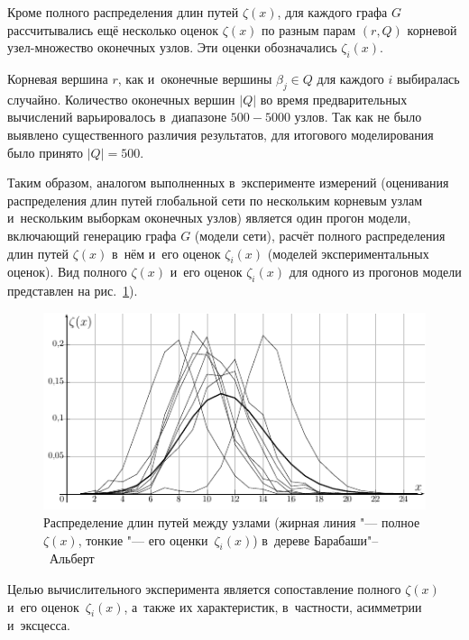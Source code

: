 \documentclass[10pt, a5paper]{article}
\begin{document}
Кроме полного распределения длин путей $\zeta(x)$, для каждого графа $G$ рассчитывались ещё 
несколько оценок $\zeta(x)$ по разным парам  $(r,Q)$ корневой узел-множество оконечных узлов. 
Эти оценки обозначались $\zeta_i(x)$.

Корневая вершина $r$, как и~оконечные вершины $\beta_j \in Q$ для каждого $i$ выбиралась случайно.
Количество оконечных вершин $|Q|$ во время предварительных вычислений варьировалось в~диапазоне $500-5000$ узлов.
Так как не было выявлено существенного различия результатов, для итогового моделирования было принято $|Q|=500$.

Таким образом, аналогом выполненных в~эксперименте измерений (оценивания распределения длин путей глобальной сети по нескольким корневым узлам и~нескольким выборкам оконечных узлов)
является один прогон модели, включающий
генерацию графа $G$ (модели сети), расчёт полного распределения длин путей $\zeta(x)$ в~нём и~его оценок $\zeta_i(x)$ (моделей экспериментальных оценок).
Вид полного $\zeta(x)$ и~его оценок $\zeta_i(x)$ для одного из прогонов модели представлен на рис.~\ref{rdp_fullpart_ba}).

\begin{figure}[!h]
  \centering
  \includegraphics[width=\linewidth]{2019_miet_kai_gav_rdp_fullpart_ba}
  \caption{Распределение длин путей  между узлами (жирная линия "--- полное $\zeta(x)$, тонкие "--- его оценки~$\zeta_i(x)$) в~дереве  Барабаши"--~Альберт} 
\label{rdp_fullpart_ba}
\end{figure}

Целью вычислительного эксперимента является сопоставление полного $\zeta(x)$ и~его оценок~$\zeta_i(x)$, а~также их характеристик,
в~частности, асимметрии и~эксцесса.
\end{document}
